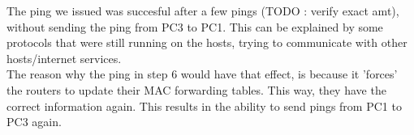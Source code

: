 The ping we issued was succesful after a few pings (TODO : verify exact amt), without sending the ping from PC3 to PC1. This can be explained by some protocols that were still running on the hosts, trying to communicate with other hosts/internet services.
\\
The reason why the ping in step 6 would have that effect, is because it 'forces' the routers to update their MAC forwarding tables. This way, they have the correct information again. This results in the ability to send pings from PC1 to PC3 again.
